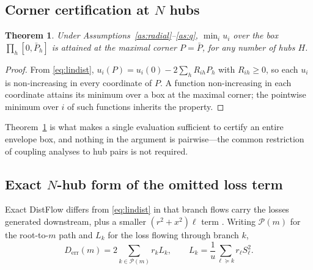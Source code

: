 \documentclass[lettersize,journal]{IEEEtran}
\newtheorem{theorem}{Theorem}
\newcommand{\Derr}{D_{\mathrm{err}}}
\begin{document}
\subsection{Corner certification at $N$ hubs}\label{sec:corner}
\begin{theorem}\label{thm:corner}
Under Assumptions~\ref{as:radial}--\ref{as:q}, $\min_i u_i$ over the box
$\prod_{h}[0,\bar P_h]$ is attained at the maximal corner $P=\bar P$, for any
number of hubs $H$.
\end{theorem}
\begin{proof}
From \eqref{eq:lindist}, $u_i(P)=u_i(0)-2\sum_h R_{ih}P_h$ with $R_{ih}\ge 0$,
so each $u_i$ is non-increasing in every coordinate of $P$. A function
non-increasing in each coordinate attains its minimum over a box at the maximal
corner; the pointwise minimum over $i$ of such functions inherits the property.
\end{proof}

Theorem~\ref{thm:corner} is what makes a single evaluation sufficient to
certify an entire envelope box, and nothing in the argument is pairwise---the
common restriction of coupling analyses to hub pairs is not required.

\subsection{Exact $N$-hub form of the omitted loss term}
Exact DistFlow differs from \eqref{eq:lindist} in that branch flows carry the
losses generated downstream, plus a smaller $(r^{2}+x^{2})\ell$ term
\cite{baran1989capacitor}. Writing $\mathcal{P}(m)$ for the root-to-$m$ path
and $L_k$ for the loss flowing through branch $k$,
\begin{equation}\label{eq:lossdef}
\Derr(m)=2\!\!\sum_{k\in\mathcal{P}(m)}\!\! r_k L_k,
\qquad
L_k=\frac{1}{u}\sum_{\ell\succeq k} r_\ell S_\ell^{2}.
\end{equation}
\end{document}
